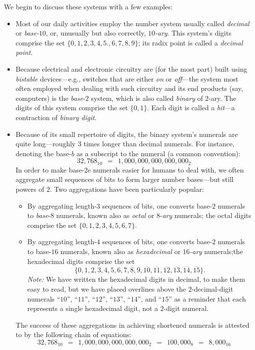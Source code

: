 \noindent
We begin to discuss these systems with a few examples:
\begin{itemize}
\item
Most of our daily activities employ the number system usually called {\it decimal} or {\it base-$10$}, or, unusually but also correctly, {\it $10$-ary}.  This system's digits comprise the set $\{0, 1, 2, 3, 4, 5., 6, 7, 8, 9\}$; its radix point is called a {\em decimal point}.
  
 

\item
Because electrical and electronic circuitry are (for the most part) built using {\it bistable} devices---e.g., switches that are either {\em on} or {\em off}---the system most often employed when dealing with such circuitry and its end products (say, computers) is the {\it base}-$2$ system, which is also called {\it binary} of $2$-ary. The digits of this system comprise the set $\{0, 1\}$.  Each digit is called a {\it bit}---a contraction of {\it binary digit}.
 

\item
Because of its small repertoire of digits, the binary system's numerals are quite long---roughly $3$ times longer than decimal numerals.  For instance, denoting the base-$b$ as a subscript to the numeral (a common convention):
\[ 32,768_{10} \ \ = \ \ 1,000,000,000,000,000_2 \]
In order to make base-$2$e numerals easier for humans to deal with, we often aggregate small sequences of bits to form larger number bases---but still powers of $2$.  Two aggregations have been particularly popular:
  \begin{itemize}
  \item
By aggregating length-$3$ sequences of bits, one converts base-$2$ numerals to {\it base}-$8$ numerals, known also as {\it octal} or $8$-{\it ary} numerals; the octal digits comprise the set $\{0, 1, 2, 3, 4, 5, 6, 7\}$.  
  \item
By aggregating length-$4$ sequences of bits, one converts base-$2$ numerals to base-$16$ numerals, known also as {\it hexadecimal} or {\it $16$-ary} numerals;the hexadecimal digits comprise the set 
\[ \{0, 1, 2, 3, 4, 5, 6, 7, 8, 9, \overline{10}, \overline{11},
\overline{12}, \overline{13}, \overline{14}, \overline{15}\}.
\]
{\it Note:} We have written the hexadecimal digits in decimal, to make them easy to read, but we have placed overlines above the $2$-decimal-digit numerals ``$10$'', ``$11$'', ``$12$'', ``$13$'',
``$14$'', and ``$15$'' as a reminder that each represents a single hexadecimal digit, not a $2$-digit numeral.    
  \end{itemize}
The success of these aggregations in achieving shortened numerals is attested to by the following chain of equations:
\[ 32,768_{10} \ \ = \ \ 1,000,000,000,000,000_2 \ \ = \ \ 100,000_8 \ \ = \ \ 8,000_{16} \]
\end{itemize}

